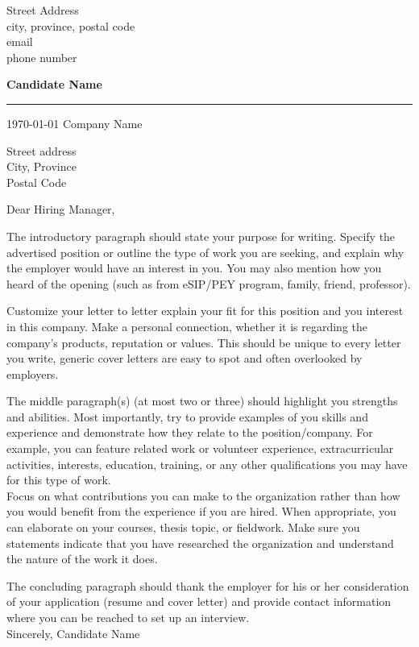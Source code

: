 \documentclass[11pt]{article}
\newcommand{\CompanyName}       {Company Name}
\newcommand{\CompanyAddress}{
	Street address\\
    City, Province\\
    Postal Code				
    }
\newcommand{\Name}{Candidate Name}
\newcommand{\Contact}{
    Street Address               \\
    city, province, postal code        \\
    email    \\
    phone number
    }
\newcommand{\SPACE}{0.2cm}
\newcommand{\Greet}{
    Dear Hiring Manager,
}
\newcommand{\What}{
    The introductory paragraph should state your purpose for writing. Specify the advertised position or outline the type of work you are seeking, and explain why the employer would have an interest in you. You may also mention how you heard of the opening (such as from eSIP/PEY program, family, friend, professor).
}
\newcommand{\Why}{
    Customize your letter to letter explain your fit for this position and you interest in this company. Make a personal connection, whether it is regarding the company's products, reputation or values. This should be unique to every letter you write, generic cover letters are easy to spot and often overlooked by employers.
}
\newcommand{\Match}{
    The middle paragraph(s) (at most two or three) should highlight you strengths and abilities. Most importantly, try to provide examples of you skills and experience and demonstrate how they relate to the position/company. For example, you can feature related work or volunteer experience, extracurricular activities, interests, education, training, or any other qualifications you may have for this type of work.\\\hfill\break
    Focus on what contributions you can make to the organization rather than how you would benefit from the experience if you are hired. When appropriate, you can elaborate on your courses, thesis topic, or fieldwork. Make sure you statements indicate that you have researched the organization and understand the nature of the work it does. 
}
\newcommand{\Thank}{
    The concluding paragraph should thank the employer for his or her consideration of your application (resume and cover letter) and provide contact information where you can be reached to set up an interview. \\\hfill\break
    Sincerely,
}
\begin{document}
    \begin{flushright}                                      %
        \Contact
    \end{flushright}
    
    \begin{flushleft}
        \hfill\newline\newline\newline
        \textbf{\huge \Name}                                %
        \vspace{\SPACE}\hrule\vspace{\SPACE}
        \today              \newline\newline\newline    	%
        \CompanyName        \newline                        %
        \CompanyAddress     \newline\newline
        \Greet              \newline\newline
        \What               \newline\newline
        \Why                \newline\newline
        \Match              \newline\newline
        \Thank              \newline
        \Name               
    \end{flushleft}
    
\end{document}
